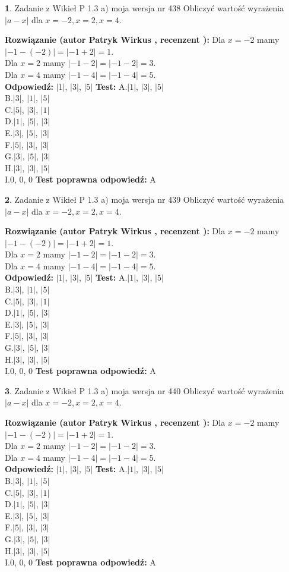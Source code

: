 \documentclass[12pt, a4paper]{article}
\theoremstyle{definition} %
\newtheorem{zad}{}
\newcommand{\zadStart}[1]{\begin{zad}#1\newline}
\newcommand{\zadStop}{\end{zad}}
\newcommand{\rozwStart}[2]{\noindent \textbf{Rozwiązanie (autor #1 , recenzent #2): }\newline}
\newcommand{\rozwStop}{\newline}
\newcommand{\odpStart}{\noindent \textbf{Odpowiedź:}\newline}
\newcommand{\odpStop}{\newline}
\newcommand{\testStart}{\noindent \textbf{Test:}\newline}
\newcommand{\testStop}{\newline}
\newcommand{\kluczStart}{\noindent \textbf{Test poprawna odpowiedź:}\newline}
\newcommand{\kluczStop}{\newline}
\begin{document}
\zadStart{Zadanie z Wikieł P 1.3 a) moja wersja nr 438}
Obliczyć wartość wyrażenia $|a - x|$ dla $x=-2,x=2,x=4$.
\zadStop
\rozwStart{Patryk Wirkus}{}
Dla $x = -2$ mamy $|-1 - (-2)| = |-1 + 2| = 1$.\\
Dla $x = 2$ mamy $|-1 - 2| = |-1 - 2| = 3$.\\
Dla $x = 4$ mamy $|-1 - 4| = |-1 - 4| = 5$.\\
\rozwStop
\odpStart
$|1|$, $|3|$, $|5|$
\odpStop
\testStart
A.$|1|$, $|3|$, $|5|$\\
B.$|3|$, $|1|$, $|5|$\\
C.$|5|$, $|3|$, $|1|$\\
D.$|1|$, $|5|$, $|3|$\\
E.$|3|$, $|5|$, $|3|$\\
F.$|5|$, $|3|$, $|3|$\\
G.$|3|$, $|5|$, $|3|$\\
H.$|3|$, $|3|$, $|5|$\\
I.$0$, $0$, $0$
\testStop
\kluczStart
A
\kluczStop



\zadStart{Zadanie z Wikieł P 1.3 a) moja wersja nr 439}
Obliczyć wartość wyrażenia $|a - x|$ dla $x=-2,x=2,x=4$.
\zadStop
\rozwStart{Patryk Wirkus}{}
Dla $x = -2$ mamy $|-1 - (-2)| = |-1 + 2| = 1$.\\
Dla $x = 2$ mamy $|-1 - 2| = |-1 - 2| = 3$.\\
Dla $x = 4$ mamy $|-1 - 4| = |-1 - 4| = 5$.\\
\rozwStop
\odpStart
$|1|$, $|3|$, $|5|$
\odpStop
\testStart
A.$|1|$, $|3|$, $|5|$\\
B.$|3|$, $|1|$, $|5|$\\
C.$|5|$, $|3|$, $|1|$\\
D.$|1|$, $|5|$, $|3|$\\
E.$|3|$, $|5|$, $|3|$\\
F.$|5|$, $|3|$, $|3|$\\
G.$|3|$, $|5|$, $|3|$\\
H.$|3|$, $|3|$, $|5|$\\
I.$0$, $0$, $0$
\testStop
\kluczStart
A
\kluczStop



\zadStart{Zadanie z Wikieł P 1.3 a) moja wersja nr 440}
Obliczyć wartość wyrażenia $|a - x|$ dla $x=-2,x=2,x=4$.
\zadStop
\rozwStart{Patryk Wirkus}{}
Dla $x = -2$ mamy $|-1 - (-2)| = |-1 + 2| = 1$.\\
Dla $x = 2$ mamy $|-1 - 2| = |-1 - 2| = 3$.\\
Dla $x = 4$ mamy $|-1 - 4| = |-1 - 4| = 5$.\\
\rozwStop
\odpStart
$|1|$, $|3|$, $|5|$
\odpStop
\testStart
A.$|1|$, $|3|$, $|5|$\\
B.$|3|$, $|1|$, $|5|$\\
C.$|5|$, $|3|$, $|1|$\\
D.$|1|$, $|5|$, $|3|$\\
E.$|3|$, $|5|$, $|3|$\\
F.$|5|$, $|3|$, $|3|$\\
G.$|3|$, $|5|$, $|3|$\\
H.$|3|$, $|3|$, $|5|$\\
I.$0$, $0$, $0$
\testStop
\kluczStart
A
\kluczStop
\end{document}
